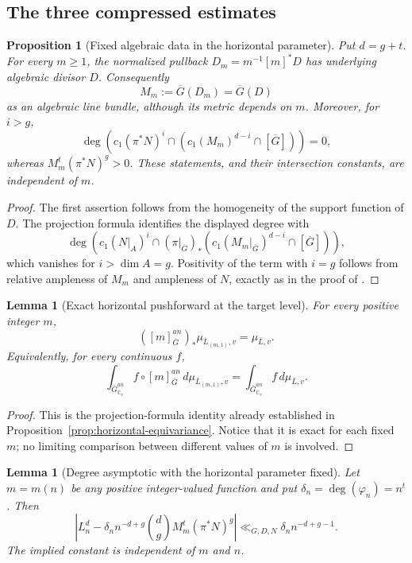 \documentclass[10pt,a4paper]{amsart}
\theoremstyle{plain}
\newtheorem{lemma}[theorem]{Lemma}
\newtheorem{proposition}[theorem]{Proposition}
\theoremstyle{plain}
\numberwithin{equation}{section}
\providecommand{\ol}{\overline}
\begin{document}
\subsection{The three compressed estimates}

\begin{proposition}[Fixed algebraic data in the horizontal parameter]
	\label{lem:fixed-horizontal-algebraic-data}
	Put \(d=g+t\).  For every \(m\ge1\), the normalized pullback
	\(D_m=m^{-1}[m]^*D\) has underlying algebraic divisor \(D\).  Consequently
	\[
	M_m:=\overline G(D_m)=\overline G(D)
	\]
	as an algebraic line bundle, although its metric depends on \(m\).  Moreover,
	for \(i>g\),
	\[
	\deg\!\left(c_1(\pi^*N)^i\cap
	(c_1(M_m)^{d-i}\cap[\overline G])\right)=0,
	\]
	whereas \(M_m^t(\pi^*N)^g>0\).  These statements, and their intersection
	constants, are independent of \(m\).
\end{proposition}

\begin{proof}
	The first assertion follows from the homogeneity of the support function of
	\(D\).  The projection formula identifies the displayed degree with
	\[
	\deg\!\left(c_1(N|_A)^i\cap
	(\pi|_{\overline G})_*
	(c_1(M_m|_{\overline G})^{d-i}\cap[\overline G])\right),
	\]
	which vanishes for \(i>\dim A=g\).  Positivity of the term with \(i=g\)
	follows from relative ampleness of \(M_m\) and ampleness of \(N\), exactly as
	in the proof of \cite[Lemma~4.2]{Ku1}.
\end{proof}

\begin{lemma}[Exact horizontal pushforward at the target level]
	\label{lem:compressed-toric-uniform-family}
	For every positive integer \(m\),
	\[
	([m]_{\overline G}^{an})_*
	\mu_{\ol L_{(m,1)},v}=\mu_{\ol L,v}.
	\]
	Equivalently, for every continuous \(f\),
	\[
	\int_{\overline G_{\mathbb C_v}^{an}}
	f\circ[m]_{\overline G}^{an}\,d\mu_{\ol L_{(m,1)},v}
	=
	\int_{\overline G_{\mathbb C_v}^{an}}f\,d\mu_{\ol L,v}.
	\]
\end{lemma}

\begin{proof}
	This is the projection-formula identity already established in
	Proposition~\ref{prop:horizontal-equivariance}.  Notice that it is exact for
	each fixed \(m\); no limiting comparison between different values of \(m\) is
	involved.
\end{proof}

\begin{lemma}[Degree asymptotic with the horizontal parameter fixed]
	\label{lem:fixed-m-degree-asymptotic}
	Let \(m=m(n)\) be any positive integer-valued function and put
	\(\delta_n=\deg(\varphi_n)=n^t\).  Then
	\[
	\left|
	L_n^d-
	\delta_n n^{-d+g}\binom{d}{g}
	M_m^t(\pi^*N)^g
	\right|
	\ll_{G,D,N}
	\delta_n n^{-d+g-1}.
	\]
	The implied constant is independent of \(m\) and \(n\).
\end{lemma}
\end{document}
